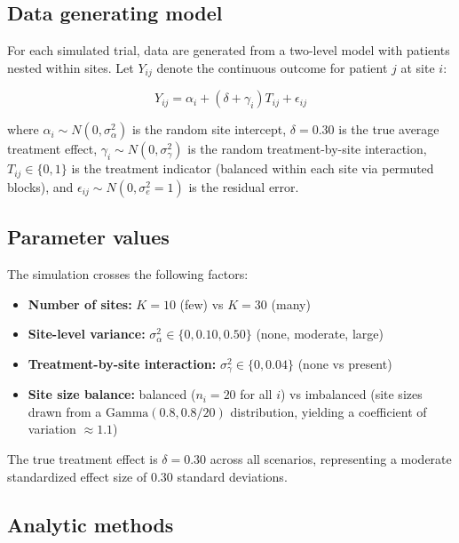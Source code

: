 \documentclass[
  11pt,
]{article}
\newcounter{none} %
\providecommand{\tightlist}{%
  \setlength{\itemsep}{0pt}\setlength{\parskip}{0pt}}
\begin{document}
\subsection{Data generating model}\label{data-generating-model}

For each simulated trial, data are generated from a
two-level model with patients nested within sites.
Let \(Y_{ij}\) denote the continuous outcome for patient \(j\)
at site \(i\):

\[Y_{ij} = \alpha_i + (\delta + \gamma_i) T_{ij} + \epsilon_{ij}\]

where \(\alpha_i \sim N(0, \sigma^2_{\alpha})\) is the
random site intercept, \(\delta = 0.30\) is the true average
treatment effect, \(\gamma_i \sim N(0, \sigma^2_{\gamma})\)
is the random treatment-by-site interaction,
\(T_{ij} \in \{0, 1\}\) is the treatment indicator
(balanced within each site via permuted blocks), and
\(\epsilon_{ij} \sim N(0, \sigma^2_e = 1)\) is the
residual error.

\subsection{Parameter values}\label{parameter-values}

The simulation crosses the following factors:

\begin{itemize}
\tightlist
\item
  \textbf{Number of sites:} \(K = 10\) (few) vs \(K = 30\) (many)
\item
  \textbf{Site-level variance:} \(\sigma^2_{\alpha} \in \{0, 0.10, 0.50\}\)
  (none, moderate, large)
\item
  \textbf{Treatment-by-site interaction:}
  \(\sigma^2_{\gamma} \in \{0, 0.04\}\) (none vs present)
\item
  \textbf{Site size balance:} balanced (\(n_i = 20\) for all \(i\))
  vs imbalanced (site sizes drawn from a
  \(\text{Gamma}(0.8, 0.8/20)\) distribution, yielding a
  coefficient of variation \(\approx 1.1\))
\end{itemize}

The true treatment effect is \(\delta = 0.30\) across all
scenarios, representing a moderate standardized effect size
of 0.30 standard deviations.

\subsection{Analytic methods}\label{analytic-methods}
\end{document}
